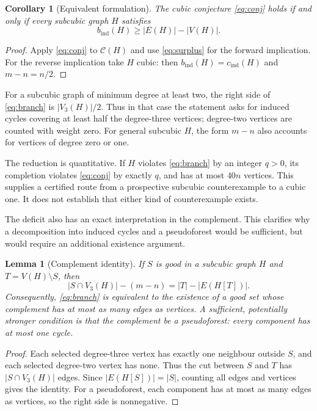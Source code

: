 \documentclass[11pt]{article}
\newtheorem{lemma}[theorem]{Lemma}
\newtheorem{corollary}[theorem]{Corollary}
\newcommand{\cind}{c_{\mathrm{ind}}}
\newcommand{\bind}{b_{\mathrm{ind}}}
\begin{document}
\begin{corollary}[Equivalent formulation]\label{cor:equivalent}
The cubic conjecture \eqref{eq:conj} holds if and only if every
subcubic graph $H$ satisfies
\begin{equation}\label{eq:branch}
 \bind(H)\geq |E(H)|-|V(H)|.
\end{equation}
\end{corollary}
\begin{proof}
Apply \eqref{eq:conj} to $\mathcal C(H)$ and use
\eqref{eq:surplus} for the forward implication.
For the reverse implication take $H$ cubic: then $\bind(H)=\cind(H)$
and $m-n=n/2$.
\end{proof}

For a subcubic graph of minimum degree at least two, the right side of
\eqref{eq:branch} is $|V_3(H)|/2$. Thus in that case the statement asks
for induced cycles covering at least half the degree-three vertices;
degree-two vertices are counted with weight zero.
For general subcubic $H$, the form $m-n$ also accounts for vertices
of degree zero or one.

The reduction is quantitative. If $H$ violates \eqref{eq:branch} by
an integer $q>0$, its completion violates \eqref{eq:conj} by exactly
$q$, and has at most $40n$ vertices. This supplies a certified route
from a prospective subcubic counterexample to a cubic one.
It does not establish that either kind of counterexample exists.

The deficit also has an exact interpretation in the complement.
This clarifies why a decomposition into induced cycles and a
pseudoforest would be sufficient, but would require an additional
existence argument.

\begin{lemma}[Complement identity]\label{lem:complement}
If $S$ is good in a subcubic graph $H$ and $T=V(H)\setminus S$, then
\[
 |S\cap V_3(H)|-(m-n)=|T|-|E(H[T])|.
\]
Consequently, \eqref{eq:branch} is equivalent to the existence of a
good set whose complement has at most as many edges as vertices.
A sufficient, potentially stronger condition is that the complement
be a pseudoforest: every component has at most one cycle.
\end{lemma}
\begin{proof}
Each selected degree-three vertex has exactly one neighbour outside
$S$, and each selected degree-two vertex has none. Thus the cut
between $S$ and $T$ has $|S\cap V_3(H)|$ edges. Since
$|E(H[S])|=|S|$, counting all edges and vertices gives the identity.
For a pseudoforest, each component has at most as many edges as
vertices, so the right side is nonnegative.
\end{proof}
\end{document}
